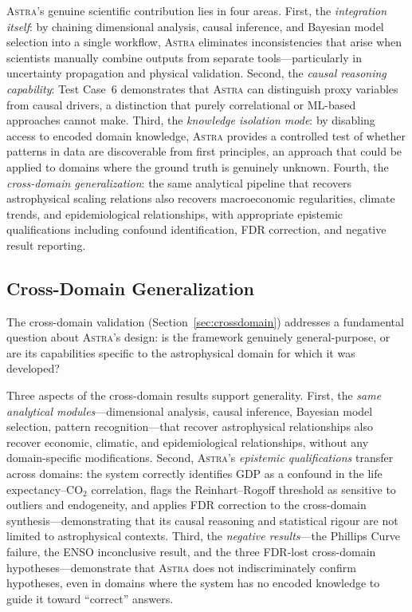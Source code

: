 \documentclass[fleqn,usenatbib]{mnras}
\newcommand{\astra}{\textsc{Astra}\xspace}
\begin{document}
\astra's genuine scientific contribution lies in four areas.
First, the \emph{integration itself}: by chaining dimensional analysis, causal inference, and Bayesian model selection into a single workflow, \astra eliminates inconsistencies that arise when scientists manually combine outputs from separate tools---particularly in uncertainty propagation and physical validation.
Second, the \emph{causal reasoning capability}: Test Case~6 demonstrates that \astra can distinguish proxy variables from causal drivers, a distinction that purely correlational or ML-based approaches cannot make.
Third, the \emph{knowledge isolation mode}: by disabling access to encoded domain knowledge, \astra provides a controlled test of whether patterns in data are discoverable from first principles, an approach that could be applied to domains where the ground truth is genuinely unknown.
Fourth, the \emph{cross-domain generalization}: the same analytical pipeline that recovers astrophysical scaling relations also recovers macroeconomic regularities, climate trends, and epidemiological relationships, with appropriate epistemic qualifications including confound identification, FDR correction, and negative result reporting.

\subsection{Cross-Domain Generalization}
\label{sec:discussion:crossdomain}

The cross-domain validation (Section~\ref{sec:crossdomain}) addresses a fundamental question about \astra's design: is the framework genuinely general-purpose, or are its capabilities specific to the astrophysical domain for which it was developed?

Three aspects of the cross-domain results support generality.
First, the \emph{same analytical modules}---dimensional analysis, causal inference, Bayesian model selection, pattern recognition---that recover astrophysical relationships also recover economic, climatic, and epidemiological relationships, without any domain-specific modifications.
Second, \astra's \emph{epistemic qualifications} transfer across domains: the system correctly identifies GDP as a confound in the life expectancy--CO$_{2}$ correlation, flags the Reinhart--Rogoff threshold as sensitive to outliers and endogeneity, and applies FDR correction to the cross-domain synthesis---demonstrating that its causal reasoning and statistical rigour are not limited to astrophysical contexts.
Third, the \emph{negative results}---the Phillips Curve failure, the ENSO inconclusive result, and the three FDR-lost cross-domain hypotheses---demonstrate that \astra does not indiscriminately confirm hypotheses, even in domains where the system has no encoded knowledge to guide it toward ``correct'' answers.
\end{document}
